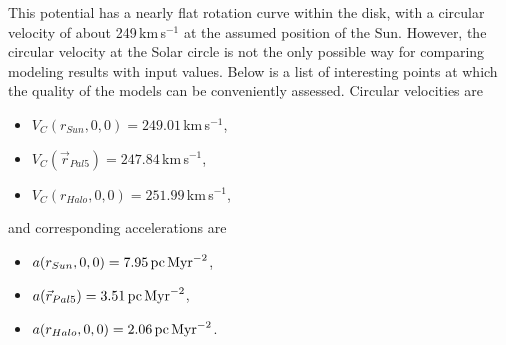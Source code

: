 This potential has a nearly flat rotation curve within the disk, with a circular velocity of about 249\,km\,s$^{-1}$ at the assumed position of the Sun. However, the circular velocity at the Solar circle is not the only possible way for comparing modeling results with input values. Below is a list of interesting points at which the quality of the models can be conveniently assessed. Circular velocities are
\begin{itemize}
  \item $V_C(r_{Sun}, 0, 0) = 249.01$\,km\,s$^{-1}$,
  \item $V_C(\vec{r}_{Pal5}) = 247.84$\,km\,s$^{-1}$,
  \item $V_C(r_{Halo}, 0, 0) = 251.99$\,km\,s$^{-1}$,
 \end{itemize}
 and corresponding accelerations are 
 \begin{itemize}
  \item $a(r_{Sun}, 0, 0) = 7.95\,\mbox{pc\,Myr}^{-2}$,
  \item $a(\vec{r}_{Pal5}) = 3.51\,\mbox{pc\,Myr}^{-2}$,
  \item $a(r_{Halo}, 0, 0) = 2.06\,\mbox{pc\,Myr}^{-2}$.
\end{itemize}
